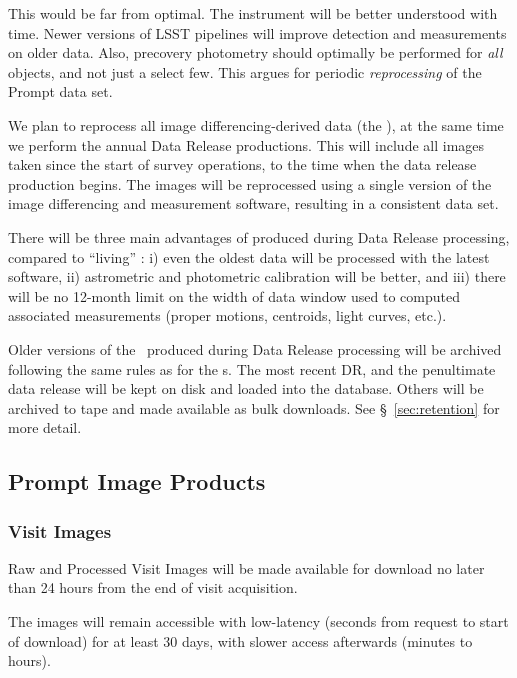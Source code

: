 \documentclass[SE,lsstdraft,toc]{lsstdoc}
\begin{document}
This would be far from optimal. The instrument will be better understood with time. Newer versions of LSST pipelines will improve detection and measurements on older data. Also, precovery photometry should optimally be performed for \emph{all} objects, and not just a select few. This argues for periodic \emph{reprocessing} of the Prompt data set. 

We plan to reprocess all image differencing-derived data (the \DB), at the same time we perform the annual Data Release productions. This will include all images taken since the start of survey operations, to the time when the data release production begins. The images will be reprocessed using a single version of the image differencing and measurement software, resulting in a consistent data set.

There will be three main advantages of \DB produced during Data Release processing, compared to
``living'' \DB:
i) even the oldest data will be processed with the latest software,
ii) astrometric and photometric calibration will be better, and
iii) there will be no 12-month limit on the width of data window used to computed associated \DIAObject
measurements (proper motions, centroids, light curves, etc.). 

Older versions of the \DB\ produced during Data Release processing will be archived following the same rules as for the \DR{}s. The most recent DR, and the penultimate data release will be kept on disk and loaded into the database. Others will be archived to tape and made available as bulk downloads. See \S~\ref{sec:retention} for more detail.

\subsection{Prompt Image Products}

\subsubsection{Visit Images}

Raw and Processed Visit Images will be made available for download no later than 24 hours from the end of visit acquisition.

The images will remain accessible with low-latency (seconds from request to start of download) for at least 30 days, with slower access afterwards (minutes to hours).
\end{document}
